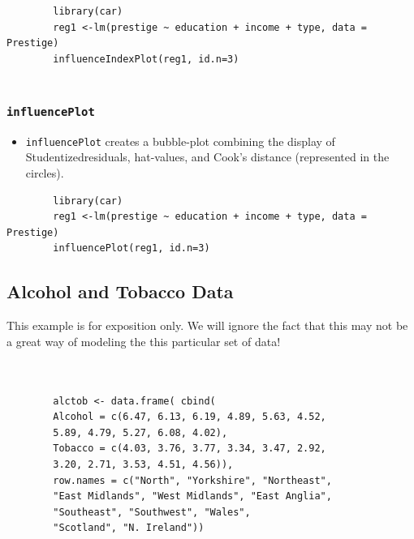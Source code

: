 \documentclass[residuals.tex]{subfiles}
\begin{document}
	\begin{framed}
		\begin{verbatim}
		library(car)
		reg1 <-lm(prestige ~ education + income + type, data = Prestige)
		influenceIndexPlot(reg1, id.n=3)
		
		\end{verbatim}
	\end{framed}
	
	
	
	\subsubsection*{\texttt{influencePlot}}
	\begin{itemize}
		\item \texttt{influencePlot} creates a bubble-plot combining the display of Studentizedresiduals, hat-values, and Cook's distance (represented in the circles).
	\end{itemize}
	
	\begin{framed}
		\begin{verbatim}
		library(car)
		reg1 <-lm(prestige ~ education + income + type, data = Prestige)
		influencePlot(reg1, id.n=3)
		\end{verbatim}
	\end{framed}
	
	\bigskip
	\subsection{Alcohol and Tobacco Data}
	This example is for exposition only. We will ignore the fact that this may not be a great way of modeling the this particular set of data!
	
	\begin{framed}
		\begin{verbatim}
		
		
		alctob <- data.frame( cbind(
		Alcohol = c(6.47, 6.13, 6.19, 4.89, 5.63, 4.52, 
		5.89, 4.79, 5.27, 6.08, 4.02),
		Tobacco = c(4.03, 3.76, 3.77, 3.34, 3.47, 2.92, 
		3.20, 2.71, 3.53, 4.51, 4.56)),
		row.names = c("North", "Yorkshire", "Northeast", 
		"East Midlands", "West Midlands", "East Anglia", 
		"Southeast", "Southwest", "Wales", 
		"Scotland", "N. Ireland"))
		
		
		\end{verbatim}
	\end{framed}
	
\end{document}
